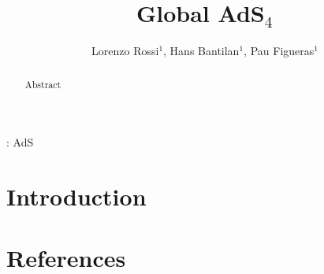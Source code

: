 \documentclass[12pt]{iopart}
\begin{document}
\title[]{Global AdS$_4$}

\author{Lorenzo Rossi$^1$, Hans Bantilan$^1$, Pau Figueras$^1$}
\address{$^1$ School of Mathematical Sciences, Queen Mary University of
  London, \\ Mile End Road, London E1 4NS, United Kingdom}

\begin{abstract}
Abstract
\end{abstract}


: AdS

%
% 




\section{Introduction}

\cite{Bantilan:2012vu}







\section*{References}


\end{document}
